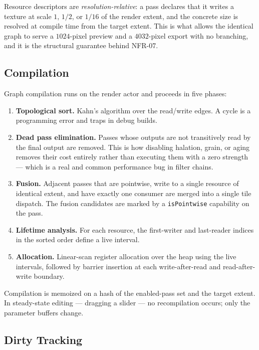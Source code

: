 Resource descriptors are \emph{resolution-relative}: a pass declares that it
writes a texture at scale $1$, $1/2$, or $1/16$ of the render extent, and the
concrete size is resolved at compile time from the target extent. This is what
allows the identical graph to serve a $1024$-pixel preview and a $4032$-pixel
export with no branching, and it is the structural guarantee behind NFR-07.

\subsection{Compilation}

Graph compilation runs on the render actor and proceeds in five phases:

\begin{enumerate}
\item \textbf{Topological sort.} Kahn's algorithm over the read/write edges.
A cycle is a programming error and traps in debug builds.
\item \textbf{Dead pass elimination.} Passes whose outputs are not
transitively read by the final output are removed. This is how disabling
halation, grain, or aging removes their cost entirely rather than executing them
with a zero strength --- which is a real and common performance bug in filter
chains.
\item \textbf{Fusion.} Adjacent passes that are pointwise, write to a single
resource of identical extent, and have exactly one consumer are merged into a
single tile dispatch. The fusion candidates are marked by a
\texttt{isPointwise} capability on the pass.
\item \textbf{Lifetime analysis.} For each resource, the first-writer and
last-reader indices in the sorted order define a live interval.
\item \textbf{Allocation.} Linear-scan register allocation over the heap using
the live intervals, followed by barrier insertion at each write-after-read and
read-after-write boundary.
\end{enumerate}

Compilation is memoized on a hash of the enabled-pass set and the target extent.
In steady-state editing --- dragging a slider --- no recompilation occurs;
only the parameter buffers change.

\subsection{Dirty Tracking}

